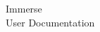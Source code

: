 \documentclass{memoir}
\begin{document}
\begin{flushright}
	\vspace*{2in}
	{\fontsize{50}{60}\selectfont Immerse}  \\
	\vspace{20pt}
	{\fontsize{30}{40}\selectfont User Documentation}
\end{flushright}

\newpage
\rfoot{\thepage}
\end{document}
